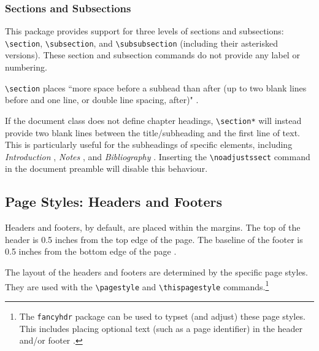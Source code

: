 \documentclass{article}
\begin{document}
\subsubsection*{Sections and Subsections}

This package provides support for three levels of sections and subsections: \texttt{\textbackslash section}, \texttt{\textbackslash subsection}, and \texttt{\textbackslash subsubsection} (including their asterisked versions). These section and subsection commands do not provide any label or numbering.

\texttt{\textbackslash section} places ``more space before a subhead than after (up to two blank lines before and one line, or double line spacing, after)" \autocite[393]{turabian_manual_2013}.

If the document class does not define chapter headings, \texttt{\textbackslash section*} will instead provide two blank lines between the title/subheading and the first line of text. This is particularly useful for the subheadings of specific elements, including \emph{Introduction} \autocite[390]{turabian_manual_2013}, \emph{Notes} \autocite[399]{turabian_manual_2013}, and \emph{Bibliography} \autocite[401]{turabian_manual_2013}. Inserting the \texttt{\textbackslash noadjustssect} command in the document preamble will disable this behaviour.


\subsection{Page Styles: Headers and Footers}
\label{sec:page_styles}

Headers and footers, by default, are placed within the margins. The top of the header is 0.5 inches from the top edge of the page. The baseline of the footer is 0.5 inches from the bottom edge of the page \autocite[372, 374]{turabian_manual_2013}.

The layout of the headers and footers are determined by the specific page styles. They are used with the \texttt{\textbackslash pagestyle} and \texttt{\textbackslash thispagestyle} commands.\footnote{%
	The \texttt{fancyhdr} package can be used to typset (and adjust) these page styles. This includes placing optional text (such as a page identifier) in the header and/or footer \autocite[374]{turabian_manual_2013}.}
\end{document}
